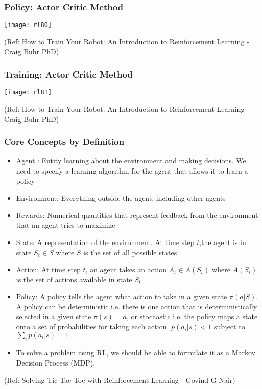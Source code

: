 \begin{frame}[fragile]\frametitle{Policy: Actor Critic Method}


\begin{center}
\texttt{[image: rl80]}
\end{center}

{\tiny (Ref: How to Train Your Robot: An Introduction to Reinforcement Learning - Craig Buhr PhD)}

\end{frame}

\begin{frame}[fragile]\frametitle{Training: Actor Critic Method}


\begin{center}
\texttt{[image: rl81]}
\end{center}

{\tiny (Ref: How to Train Your Robot: An Introduction to Reinforcement Learning - Craig Buhr PhD)}

\end{frame}


\begin{frame}[fragile]\frametitle{Core Concepts by Definition}


\begin{itemize}
\item Agent : Entity learning about the environment and making decisions. We need to specify a learning algorithm for the agent that allows it to learn a policy
\item Environment: Everything outside the agent, including other agents
\item Rewards: Numerical quantities that represent feedback from the environment that an agent tries to maximize
\item State: A representation of the environment. At time step $t$,the agent is in state $S_t \in S$ where $S$ is the set of all possible states
\item Action: At time step $t$, an agent takes an action $A_t \in A(S_t)$ where $A(S_t)$ is the set of actions available in state $S_t$
\item Policy: A policy tells the agent what action to take in a given state $\pi(a|S)$. A policy can be deterministic i.e. there is one action that is deterministically selected in a given state $\pi(s)=a$, or stochastic i.e. the policy maps a state onto a set of probabilities for taking each action. $p(a_i|s) < 1$ subject to $\sum_{i} p(a_i|s) = 1$
\item To solve a problem using RL, we should be able to formulate it as a Markov Decision Process (MDP).
\end{itemize}



{\tiny (Ref: Solving Tic-Tac-Toe with Reinforcement Learning - Govind G Nair)}

\end{frame}

